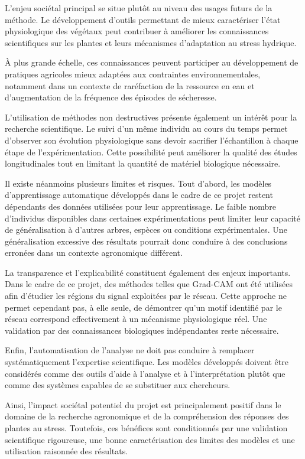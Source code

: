\documentclass[12pt,a4paper,twoside]{article}
\begin{document}
L'enjeu sociétal principal se situe plutôt au niveau des usages futurs de la méthode. Le développement d'outils permettant de mieux caractériser l'état physiologique des végétaux peut contribuer à améliorer les connaissances scientifiques sur les plantes et leurs mécanismes d'adaptation au stress hydrique.

À plus grande échelle, ces connaissances peuvent participer au développement de pratiques agricoles mieux adaptées aux contraintes environnementales, notamment dans un contexte de raréfaction de la ressource en eau et d'augmentation de la fréquence des épisodes de sécheresse.

L'utilisation de méthodes non destructives présente également un intérêt pour la recherche scientifique. Le suivi d'un même individu au cours du temps permet d'observer son évolution physiologique sans devoir sacrifier l'échantillon à chaque étape de l'expérimentation. Cette possibilité peut améliorer la qualité des études longitudinales tout en limitant la quantité de matériel biologique nécessaire.

Il existe néanmoins plusieurs limites et risques. Tout d'abord, les modèles d'apprentissage automatique développés dans le cadre de ce projet restent dépendants des données utilisées pour leur apprentissage. Le faible nombre d'individus disponibles dans certaines expérimentations peut limiter leur capacité de généralisation à d'autres arbres, espèces ou conditions expérimentales. Une généralisation excessive des résultats pourrait donc conduire à des conclusions erronées dans un contexte agronomique différent.

La transparence et l'explicabilité constituent également des enjeux importants. Dans le cadre de ce projet, des méthodes telles que Grad-CAM ont été utilisées afin d'étudier les régions du signal exploitées par le réseau. Cette approche ne permet cependant pas, à elle seule, de démontrer qu'un motif identifié par le réseau correspond effectivement à un mécanisme physiologique réel. Une validation par des connaissances biologiques indépendantes reste nécessaire.

Enfin, l'automatisation de l'analyse ne doit pas conduire à remplacer systématiquement l'expertise scientifique. Les modèles développés doivent être considérés comme des outils d'aide à l'analyse et à l'interprétation plutôt que comme des systèmes capables de se substituer aux chercheurs.

Ainsi, l'impact sociétal potentiel du projet est principalement positif dans le domaine de la recherche agronomique et de la compréhension des réponses des plantes au stress. Toutefois, ces bénéfices sont conditionnés par une validation scientifique rigoureuse, une bonne caractérisation des limites des modèles et une utilisation raisonnée des résultats.
\end{document}
